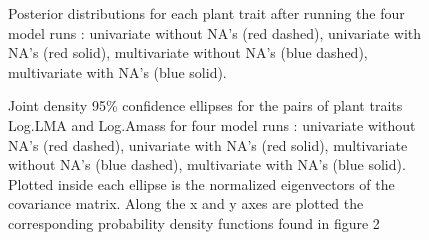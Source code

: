 \documentclass[12pt,fleqn]{article}
\begin{document}
\begin{figure}[h]
  \caption{Posterior distributions for each plant trait after running the four model runs : univariate without NA's (red dashed), univariate with NA's (red solid), multivariate without NA's (blue dashed), multivariate with NA's (blue solid).}
  \label{fig:key}
\end{figure}

\begin{figure}[h]
  \caption{Joint density 95\% confidence ellipses for the pairs of plant traits Log.LMA and Log.Amass for four model runs : univariate without NA's (red dashed), univariate with NA's (red solid), multivariate without NA's (blue dashed), multivariate with NA's (blue solid). Plotted inside each ellipse is the normalized eigenvectors of the covariance matrix. Along the x and y axes are plotted the corresponding probability density functions found in figure 2}
  \label{fig:key}
\end{figure}
\end{document}
